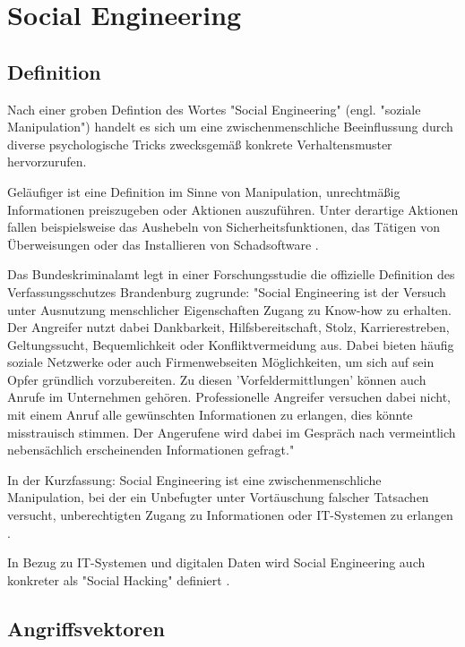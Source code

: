 \chapter{Social Engineering}

\section{Definition}

Nach einer groben Defintion des Wortes "Social Engineering" (engl. "soziale Manipulation")
handelt es sich um eine zwischenmenschliche Beeinflussung durch diverse psychologische
Tricks zwecksgemäß konkrete Verhaltensmuster hervorzurufen.

Geläufiger ist eine Definition im Sinne von Manipulation, unrechtmäßig Informationen preiszugeben oder Aktionen auszuführen.
Unter derartige Aktionen fallen beispielsweise das Aushebeln von Sicherheitsfunktionen, das Tätigen von Überweisungen oder
das Installieren von Schadsoftware .

Das Bundeskriminalamt legt in einer Forschungsstudie die offizielle Definition des Verfassungsschutzes Brandenburg
zugrunde: "Social Engineering ist der Versuch unter Ausnutzung menschlicher Eigenschaften Zugang zu Know-how zu erhalten.
Der Angreifer nutzt dabei Dankbarkeit, Hilfsbereitschaft, Stolz, Karrierestreben, Geltungssucht, Bequemlichkeit oder Konfliktvermeidung aus.
Dabei bieten häufig soziale Netzwerke oder auch Firmenwebseiten Möglichkeiten, um sich auf sein Opfer gründlich vorzubereiten.
Zu diesen 'Vorfeldermittlungen' können auch Anrufe im Unternehmen gehören.
Professionelle Angreifer versuchen dabei nicht, mit einem Anruf alle gewünschten Informationen zu erlangen,
dies könnte misstrauisch stimmen. Der Angerufene wird dabei im Gespräch nach vermeintlich nebensächlich erscheinenden Informationen gefragt."

In der Kurzfassung: Social Engineering ist eine zwischenmenschliche Manipulation,
bei der ein Unbefugter unter Vortäuschung falscher Tatsachen versucht, unberechtigten Zugang zu Informationen oder IT-Systemen zu erlangen .

In Bezug zu IT-Systemen und digitalen Daten wird Social Engineering auch konkreter als "Social Hacking" definiert .

\section{Angriffsvektoren}


